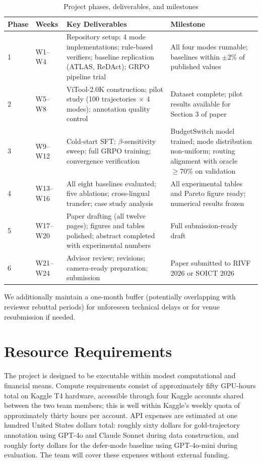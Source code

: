 \documentclass[11pt,a4paper]{article}
\begin{document}
\begin{table}[h]
\caption{Project phases, deliverables, and milestones}
\label{tab:timeline}
\centering
\begin{tabular}{p{} p{} p{} p{}}
\toprule
Phase & Weeks & Key Deliverables & Milestone \\
\midrule
1 & W1--W4 & Repository setup; 4 mode implementations; rule-based verifiers; baseline replication (ATLAS, ReDAct); GRPO pipeline trial & All four modes runnable; baselines within $\pm 2\%$ of published values \\[0.5em]
2 & W5--W8 & ViTool-2.0K construction; pilot study (100 trajectories $\times$ 4 modes); annotation quality control & Dataset complete; pilot results available for Section 3 of paper \\[0.5em]
3 & W9--W12 & Cold-start SFT; $\beta$-sensitivity sweep; full GRPO training; convergence verification & BudgetSwitch model trained; mode distribution non-uniform; routing alignment with oracle $\geq 70\%$ on validation \\[0.5em]
4 & W13--W16 & All eight baselines evaluated; five ablations; cross-lingual transfer; case study analysis & All experimental tables and Pareto figure ready; numerical results frozen \\[0.5em]
5 & W17--W20 & Paper drafting (all twelve pages); figures and tables polished; abstract completed with experimental numbers & Full submission-ready draft \\[0.5em]
6 & W21--W24 & Advisor review; revisions; camera-ready preparation; submission & Paper submitted to RIVF 2026 or SOICT 2026 \\
\bottomrule
\end{tabular}
\end{table}

We additionally maintain a one-month buffer (potentially overlapping with reviewer rebuttal periods) for unforeseen technical delays or for venue resubmission if needed.

\section{Resource Requirements}

The project is designed to be executable within modest computational and financial means. Compute requirements consist of approximately fifty GPU-hours total on Kaggle T4 hardware, accessible through four Kaggle accounts shared between the two team members; this is well within Kaggle's weekly quota of approximately thirty hours per account. API expenses are estimated at one hundred United States dollars total: roughly sixty dollars for gold-trajectory annotation using GPT-4o and Claude Sonnet during data construction, and roughly forty dollars for the defer-mode baseline using GPT-4o-mini during evaluation. The team will cover these expenses without external funding.
\end{document}
